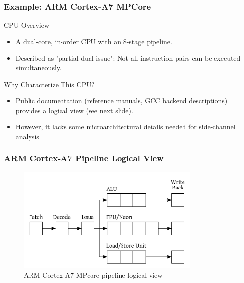\begin{frame}
    \frametitle{Example: ARM Cortex-A7 MPCore}
    \begin{block}{CPU Overview}
        \begin{itemize}
            \item A dual-core, in-order CPU with an 8-stage pipeline.
            \item Described as "partial dual-issue": Not all instruction pairs can be executed simultaneously.
        \end{itemize}
    \end{block}

    \begin{block}{Why Characterize This CPU?}
        \begin{itemize}
            \item Public documentation (reference manuals, GCC backend descriptions) provides a logical view (see next slide).
            \item However, it lacks some microarchitectural details needed for side-channel analysis
        \end{itemize}
    \end{block}
\end{frame}


\begin{frame}
    \frametitle{ARM Cortex-A7 Pipeline Logical View}
    \begin{figure}
        \centering
        \includegraphics[width=0.8\textwidth]{Pictures/cortexA7.png} 
        \caption{ARM Cortex-A7 MPcore pipeline logical view }
        \label{fig:cortex-a7-pipeline}
    \end{figure}
\end{frame}


